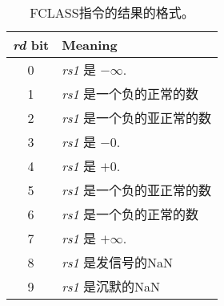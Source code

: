 \begin{table}[htp]
\begin{small}
\begin{center}
\begin{tabular}{|c|l|}
\hline
{\em rd} bit &
Meaning \\
\hline
0 & {\em rs1} 是 $-\infty$. \\
1 & {\em rs1} 是一个负的正常的数  %
                                \\
2 & {\em rs1} 是一个负的亚正常的数 %
                                  \\
3 & {\em rs1} 是 $-0$. \\
4 & {\em rs1} 是 $+0$. \\
5 & {\em rs1} 是一个负的亚正常的数  %
                                  \\
6 & {\em rs1} 是一个负的正常的数  %
                                      \\
7 & {\em rs1} 是 $+\infty$. \\
8 & {\em rs1} 是发信号的NaN  %
                                \\
9 & {\em rs1} 是沉默的NaN  %
                                    \\
\hline
\end{tabular}
\end{center}
\end{small}
\caption{FCLASS指令的结果的格式。
}
\label{tab:fclass}
\end{table}
